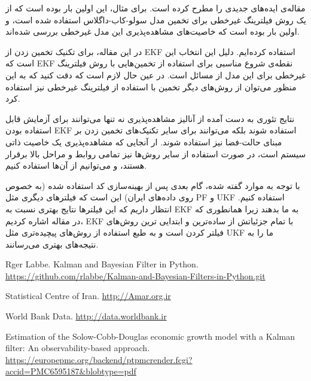 \documentclass[11pt, fleqn]{article}
\begin{document}
\begin{multicols}{2}


مقاله‌ی
\cite{main}
 ایده‌های جدیدی را مطرح کرده است. برای مثال، این اولین بار بوده است که از یک روش فیلترینگ غیرخطی برای تخمین مدل سولو-کاب-داگلاس استفاده شده است، و اولین بار بوده است که خاصیت‌های مشاهده‌پذیری این مدل غیرخطی بررسی شده‌اند. 

در این مقاله، برای تکنیک تخمین زدن از EKF استفاده کرده‌ایم. دلیل این انتخاب این است که EKF نقطه‌ی شروع مناسبی برای استفاده از تخمین‌هایی با روش فیلترینگ غیرخطی برای این مدل از مسائل است. در عین حال لازم است که دقت کنید که به این منظور می‌توان از روش‌های دیگر تخمین‌ با استفاده از فیلترینگ غیرخطی نیز استفاده کرد.

نتایج تئوری به دست آمده از آنالیز مشاهده‌پذیری نه تنها می‌توانند برای آزمایش قابل استفاده بودن EKF استفاده شوند بلکه می‌توانند برای سایر تکنیک‌های تخمین زدن بر مبنای حالت-فضا
نیز استفاده شوند. ار آنجایی که مشاهده‌پذیری یک خاصیت ذاتی سیستم است، در صورت استفاده از سایر روش‌ها نیز تمامی روابط و مراحل بالا برقرار هستند، و می‌توانیم از آن‌ها استفاده کنیم.

با توجه به موارد گفته شده، گام بعدی پس از بهینه‌سازی کد استفاده شده (به خصوص روی داده‌های ایران) این است که فیلتر‌های دیگری مثل
PF
و
UKF
استفاده کنیم. انتظار داریم که این فیلترها نتایج بهتری نسبت به
EKF
به ما بدهند زیرا همانطوری که در مقاله اشاره کردیم، 
EKF
با تمام جزئیاتش از ساده‌ترین و ابتدایی ترین روش‌های فیلتر کردن است و به طبع استفاده از روش‌های پیچیده‌تری مثل UKF ما را به نتیجه‌های بهتری می‌رسانند.

\end{multicols}






















\newhline
\begin{LTR}
\begin{thebibliography}{99}

Rger Labbe. Kalman and Bayesian Filter in Python. \url{https://github.com/rlabbe/Kalman-and-Bayesian-Filters-in-Python.git}

  Statistical Centre of Iran. \url{http://Amar.org.ir}

World Bank Data. \url{http://data.worldbank.ir}

Estimation of the Solow-Cobb-Douglas economic growth model with a
Kalman filter: An observability-based approach. \url{https://europepmc.org/backend/ptpmcrender.fcgi?accid=PMC6595187&blobtype=pdf}
\end{thebibliography}
\end{LTR}
\end{document}
